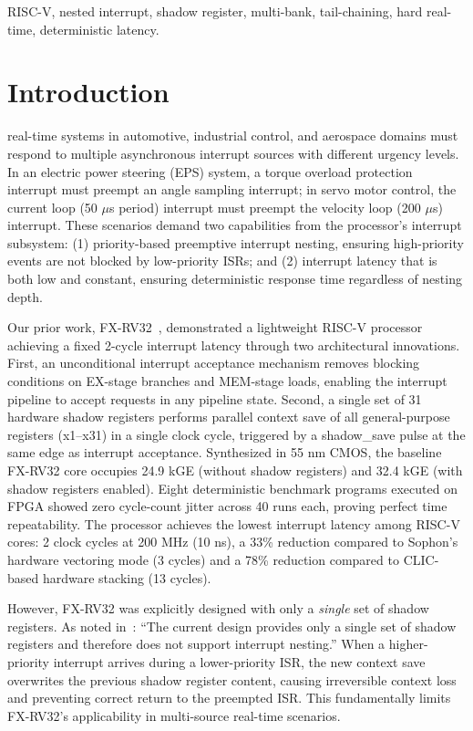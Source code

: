 \documentclass[letterpaper,journal]{IEEEtran}
\begin{document}
\begin{IEEEkeywords}
RISC-V, nested interrupt, shadow register, multi-bank, tail-chaining, hard real-time, deterministic latency.
\end{IEEEkeywords}

\section{Introduction}
 real-time systems in automotive, industrial control, and aerospace domains must respond to multiple asynchronous interrupt sources with different urgency levels.
In an electric power steering (EPS) system, a torque overload protection interrupt must preempt an angle sampling interrupt; in servo motor control, the current loop (50 $\mu$s period) interrupt must preempt the velocity loop (200 $\mu$s) interrupt.
These scenarios demand two capabilities from the processor's interrupt subsystem: (1) priority-based preemptive interrupt nesting, ensuring high-priority events are not blocked by low-priority ISRs; and (2) interrupt latency that is both low and constant, ensuring deterministic response time regardless of nesting depth.

Our prior work, FX-RV32~\cite{ref1}, demonstrated a lightweight RISC-V processor achieving a fixed 2-cycle interrupt latency through two architectural innovations.
First, an unconditional interrupt acceptance mechanism removes blocking conditions on EX-stage branches and MEM-stage loads, enabling the interrupt pipeline to accept requests in any pipeline state.
Second, a single set of 31 hardware shadow registers performs parallel context save of all general-purpose registers (x1--x31) in a single clock cycle, triggered by a shadow\_save pulse at the same edge as interrupt acceptance.
Synthesized in 55 nm CMOS, the baseline FX-RV32 core occupies 24.9 kGE (without shadow registers) and 32.4 kGE (with shadow registers enabled).
Eight deterministic benchmark programs executed on FPGA showed zero cycle-count jitter across 40 runs each, proving perfect time repeatability.
The processor achieves the lowest interrupt latency among RISC-V cores: 2 clock cycles at 200 MHz (10 ns), a 33\% reduction compared to Sophon's hardware vectoring mode (3 cycles) and a 78\% reduction compared to CLIC-based hardware stacking (13 cycles).

However, FX-RV32 was explicitly designed with only a \emph{single} set of shadow registers.
As noted in~\cite{ref1}: ``The current design provides only a single set of shadow registers and therefore does not support interrupt nesting.''
When a higher-priority interrupt arrives during a lower-priority ISR, the new context save overwrites the previous shadow register content, causing irreversible context loss and preventing correct return to the preempted ISR.
This fundamentally limits FX-RV32's applicability in multi-source real-time scenarios.
\end{document}
